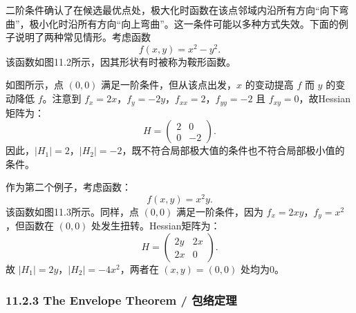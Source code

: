 \begin{translation}
二阶条件确认了在候选最优点处，极大化时函数在该点邻域内沿所有方向``向下弯曲''，极小化时沿所有方向``向上弯曲''。这一条件可能以多种方式失效。下面的例子说明了两种常见情形。考虑函数
\[
f(x, y) = x^2 - y^2.
\]
该函数如图11.2所示，因其形状有时被称为鞍形函数。

如图所示，点 $(0,0)$ 满足一阶条件，但从该点出发，$x$ 的变动提高 $f$ 而 $y$ 的变动降低 $f$。注意到 $f_x = 2x$，$f_y = -2y$，$f_{xx} = 2$，$f_{yy} = -2$ 且 $f_{xy} = 0$，故Hessian矩阵为：
\[
H = \begin{pmatrix} 2 & 0 \\ 0 & -2 \end{pmatrix}.
\]
因此，$|H_1| = 2$，$|H_2| = -2$，既不符合局部极大值的条件也不符合局部极小值的条件。

作为第二个例子，考虑函数：
\[
f(x, y) = x^2 y.
\]
该函数如图11.3所示。同样，点 $(0,0)$ 满足一阶条件，因为 $f_x = 2xy$，$f_y = x^2$，但函数在 $(0,0)$ 处发生扭转。Hessian矩阵为：
\[
H = \begin{pmatrix} 2y & 2x \\ 2x & 0 \end{pmatrix}.
\]
故 $|H_1| = 2y$，$|H_2| = -4x^2$，两者在 $(x, y) = (0,0)$ 处均为0。
\end{translation}

\subsubsection{11.2.3 The Envelope Theorem / 包络定理}

